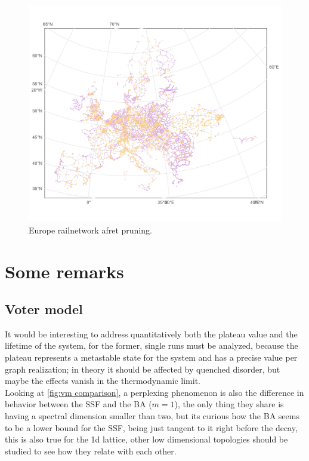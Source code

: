 \begin{appendices}
\begin{figure}[htbp]
\end{figure}
\begin{figure}[htbp]
  \centering
  \includegraphics[width=15cm,keepaspectratio]{images/Europe_pruned.png}
  \caption{Europe railnetwork afret pruning.}
  
\end{figure}
\chapter{Some remarks}
\section{Voter model}
It would be interesting to address quantitatively both the plateau value and the lifetime of the system, for the former, single runs must be analyzed, because the plateau represents a metastable state for the system and has a precise value per graph realization; in theory it should be affected by quenched disorder, but maybe the effects vanish in the thermodynamic limit.\\
Looking at  \ref{fig:vm comparison}, a perplexing phenomenon is also the difference in behavior between the SSF and the BA ($m=1$), the only thing they share is having a spectral dimension smaller than two, but its curious how the BA seems to be a lower bound for the SSF, being just tangent to it right before the decay, this is also true for the 1d lattice, other low dimensional topologies should be studied to see how they relate with each other.\\


\end{appendices}
